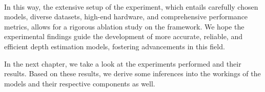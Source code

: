 \paragraph{}In this way, the extensive setup of the experiment, which entails carefully chosen models, diverse datasets, high-end hardware, and comprehensive performance metrics, allows for a rigorous ablation study on the {\rmvd} framework. We hope the experimental findings guide the development of more accurate, reliable, and efficient depth estimation models, fostering advancements in this field.\par
In the next chapter, we take a look at the experiments performed and their results. Based on these results, we derive some inferences into the workings of the models and their respective components as well. 


